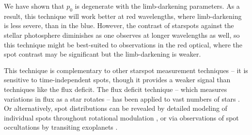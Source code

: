 We have shown that $p_0$ is degenerate with the limb-darkening parameters. As a result, this technique will work better at red wavelengths, where limb-darkening is less severe, than in the blue. However, the contrast of starspots against the stellar photosphere diminishes as one observes at longer wavelengths as well, so this technique might be best-suited to observations in the red optical, where the spot contrast may be significant but the limb-darkening is weaker.

This technique is complementary to other starspot measurement techniques -- it is sensitive to time-independent spots, though it  provides a weaker signal than techniques like the flux deficit. The flux deficit technique -- which measures variations in flux as a star rotates -- has been applied to vast numbers of \kepler stars \citep{Walkowicz2013, Notsu2013, Mathur2014}. Or alternatively, spot distributions can be revealed by detailed modeling of individual spots throughout rotational modulation \citep{Davenport2015}, or via observations of spot occultations by transiting exoplanets \citep[for example: ][]{Wolter2009,Sanchis-Ojeda2011,Davenport2015thesis,Morris2017a,Dai2018}.

